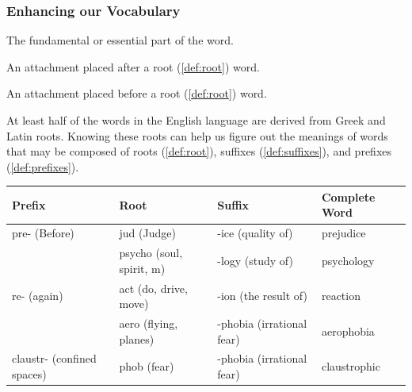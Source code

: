 
\subsubsection{Enhancing our Vocabulary}
\label{sub_sub_sec:enhancing_our_vocabulary}

\begin{definition}[Root]
  \label{def:root}

  The fundamental or essential part of the word.
\end{definition}

\begin{definition}[Suffixes]
  \label{def:suffixes}

  An attachment placed after a root (\ref{def:root}) word.
\end{definition}

\begin{definition}[Prefixes]
  \label{def:prefixes}

  An attachment placed before a root (\ref{def:root}) word.
\end{definition}

At least half of the words in the English language are derived from Greek and
Latin roots. Knowing these roots can help us figure out the meanings of words
that may be composed of roots (\ref{def:root}), suffixes (\ref{def:suffixes}),
and prefixes (\ref{def:prefixes}).

\begin{center}
    \begin{tabular}{|l|l|l|l|}
      \hline
      Prefix & Root & Suffix & Complete Word \\
      \hline
      pre- (Before) & jud (Judge) & -ice (quality of) & prejudice \\
      \hline
      & psycho (soul, spirit, m)  & -logy (study of) & psychology \\
      \hline
      re- (again) & act (do, drive, move) & -ion (the result of) & reaction \\
      \hline
      & aero (flying, planes) & -phobia (irrational fear) & aerophobia \\
      \hline
      claustr- (confined spaces) & phob (fear) & -phobia (irrational fear) &
      claustrophic \\
      \hline
    \end{tabular}
\end{center}

